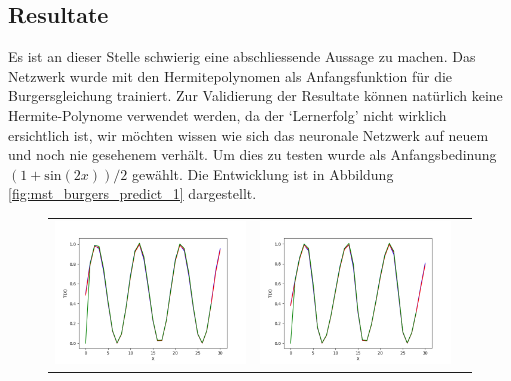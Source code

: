 \subsection{Resultate}

Es ist an dieser Stelle schwierig eine abschliessende Aussage zu
machen. Das Netzwerk wurde mit den Hermitepolynomen als Anfangsfunktion
für die Burgersgleichung trainiert. Zur Validierung der Resultate
können natürlich keine Hermite-Polynome verwendet werden, da der
`Lernerfolg' nicht wirklich ersichtlich ist, wir möchten wissen wie
sich das neuronale Netzwerk auf neuem und noch nie gesehenem verhält.
Um dies zu testen wurde als Anfangsbedinung $(1 + \text{sin}(2x))
/ 2$ gewählt. Die Entwicklung ist in Abbildung
\ref{fig:mst_burgers_predict_1} dargestellt.

\begin{figure}
	\centering
	\begin{tabular}{ccc}
		\includegraphics[scale=0.27]{learning/img/burger_predict0.png} &
		\includegraphics[scale=0.27]{learning/img/burger_predict10.png} &

\end{tabular}
\end{figure}
